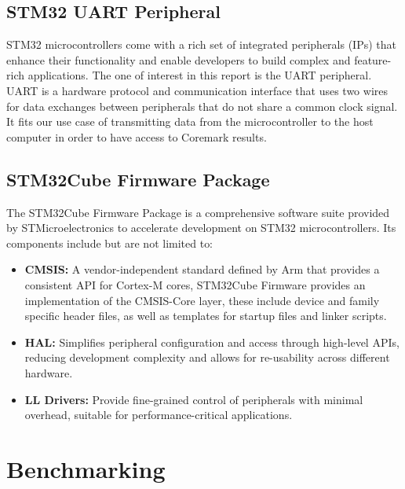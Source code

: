 \subsection{STM32 UART Peripheral}
STM32 microcontrollers come with a rich set of integrated peripherals (IPs) that enhance their functionality and enable developers to build complex and feature-rich applications. The one of interest in this report is the UART peripheral.
UART is a hardware protocol and communication interface that uses two wires for data exchanges between peripherals that do not share a common clock signal. It fits our use case of transmitting data from the microcontroller to the host computer in order to have access to Coremark results.
\newpage
\subsection{STM32Cube Firmware Package}
The STM32Cube Firmware Package is a comprehensive software suite provided by STMicroelectronics to accelerate development on STM32 microcontrollers. Its components include but are not limited to:
\begin{itemize}
    \item \textbf{CMSIS:} A vendor-independent standard defined by Arm that provides a consistent API for Cortex-M cores, STM32Cube Firmware provides an implementation of the CMSIS-Core layer, these include device and family specific header files, as well as templates for startup files and linker scripts.
    \item \textbf{HAL:} Simplifies peripheral configuration and access through high-level APIs, reducing development complexity and allows for re-usability across different hardware.
    \item \textbf{LL Drivers:} Provide fine-grained control of peripherals with minimal overhead, suitable for performance-critical applications.
\end{itemize}


\section{Benchmarking}
